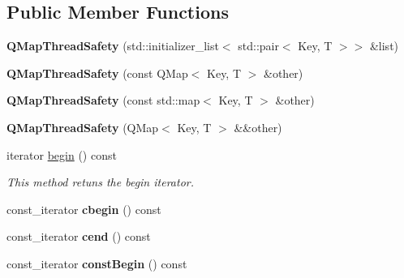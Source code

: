 \subsection*{Public Member Functions}
\begin{DoxyCompactItemize}
\item 
\mbox{\label{class_q_map_thread_safety_a8b1bc71d8c92c4d01b6b3baae9787bb4}} 
{\bfseries Q\+Map\+Thread\+Safety} (std\+::initializer\+\_\+list$<$ std\+::pair$<$ Key, T $>$$>$ \&list)
\item 
\mbox{\label{class_q_map_thread_safety_a368c8f4f05a48864209ab6ff5cf2f090}} 
{\bfseries Q\+Map\+Thread\+Safety} (const Q\+Map$<$ Key, T $>$ \&other)
\item 
\mbox{\label{class_q_map_thread_safety_a1335c04a2df7eda320f7a778854531fc}} 
{\bfseries Q\+Map\+Thread\+Safety} (const std\+::map$<$ Key, T $>$ \&other)
\item 
\mbox{\label{class_q_map_thread_safety_a9aacfb2a81fb927546a222cbfd78000d}} 
{\bfseries Q\+Map\+Thread\+Safety} (Q\+Map$<$ Key, T $>$ \&\&other)
\item 
iterator \hyperlink{class_q_map_thread_safety_ac197a5375913e4ac19910b9bc4191a95}{begin} () const
\begin{DoxyCompactList}\small\item\em This method retuns the begin iterator. \end{DoxyCompactList}\item 
\mbox{\label{class_q_map_thread_safety_aeddc5f7a55aebb3e93d78cf30a3dd2e1}} 
const\+\_\+iterator {\bfseries cbegin} () const
\item 
\mbox{\label{class_q_map_thread_safety_a199144509173057ede04d61f7294b266}} 
const\+\_\+iterator {\bfseries cend} () const
\item 
\mbox{\label{class_q_map_thread_safety_a300f55a4c8e8ed3b5ccc2824dc18e60c}} 
const\+\_\+iterator {\bfseries const\+Begin} () const
\item 
\mbox{\label{class_q_map_thread_safety_aa98a2af8cafc423c6bc6a04fec106b39}} 
$$
\end{DoxyCompactItemize}

